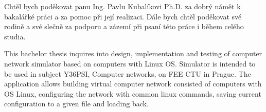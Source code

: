 \documentclass[11pt,twoside,a4paper]{book}
\begin{document}

\coverpagestarts


\acknowledgements
\noindent
Chtěl bych poděkovat panu Ing. Pavlu Kubalíkovi Ph.D. za dobrý námět k bakalářké práci a za pomoc při její realizaci. Dále bych chtěl poděkovat své rodině a své slečně za podporu a zázemí při psaní této práce i během celého studia.




 
\abstractpage



This bachelor thesis inquires into design, implementation and testing of computer network simulator based on computers with
Linux OS. Simulator is intended to be used in subject Y36PSI, Computer networks, on FEE CTU in Prague. The application allows
building virtual computer network consisted of computers with OS Linux, configuring the network with common linux commands, saving
current configuration to a given file and loading back.
\end{document}
